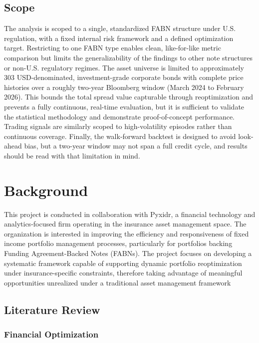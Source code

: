 \documentclass[12pt]{article}
\begin{document}
\subsection{Scope}

The analysis is scoped to a single, standardized FABN structure under U.S. regulation, with a fixed internal risk framework and a defined optimization target. Restricting to one FABN type enables clean, like-for-like metric comparison but limits the generalizability of the findings to other note structures or non-U.S. regulatory regimes. The asset universe is limited to approximately 303 USD-denominated, investment-grade corporate bonds with complete price histories over a roughly two-year Bloomberg window (March 2024 to February 2026). This bounds the total spread value capturable through reoptimization and prevents a fully continuous, real-time evaluation, but it is sufficient to validate the statistical methodology and demonstrate proof-of-concept performance. Trading signals are similarly scoped to high-volatility episodes rather than continuous coverage. Finally, the walk-forward backtest is designed to avoid look-ahead bias, but a two-year window may not span a full credit cycle, and results should be read with that limitation in mind.


\section{Background}

This project is conducted in collaboration with Pyxidr, a financial technology and analytics-focused firm operating in the insurance asset management space. The organization is interested in improving the efficiency and responsiveness of fixed income portfolio management processes, particularly for portfolios backing Funding Agreement-Backed Notes (FABNs). The project focuses on developing a systematic framework capable of supporting dynamic portfolio reoptimization under insurance-specific constraints, therefore taking advantage of meaningful opportunities unrealized under a traditional asset management framework

\subsection{Literature Review}

\subsubsection{Financial Optimization} 
\end{document}
